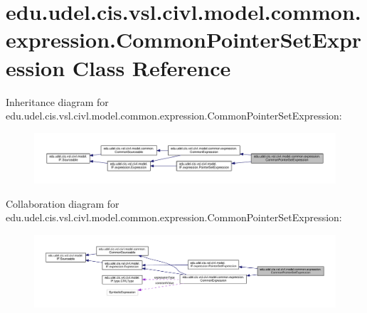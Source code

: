 \hypertarget{classedu_1_1udel_1_1cis_1_1vsl_1_1civl_1_1model_1_1common_1_1expression_1_1CommonPointerSetExpression}{}\section{edu.\+udel.\+cis.\+vsl.\+civl.\+model.\+common.\+expression.\+Common\+Pointer\+Set\+Expression Class Reference}
\label{classedu_1_1udel_1_1cis_1_1vsl_1_1civl_1_1model_1_1common_1_1expression_1_1CommonPointerSetExpression}


Inheritance diagram for edu.\+udel.\+cis.\+vsl.\+civl.\+model.\+common.\+expression.\+Common\+Pointer\+Set\+Expression\+:
\nopagebreak
\begin{figure}[H]
\begin{center}
\leavevmode
\includegraphics[width=350pt]{classedu_1_1udel_1_1cis_1_1vsl_1_1civl_1_1model_1_1common_1_1expression_1_1CommonPointerSetExpression__inherit__graph}
\end{center}
\end{figure}


Collaboration diagram for edu.\+udel.\+cis.\+vsl.\+civl.\+model.\+common.\+expression.\+Common\+Pointer\+Set\+Expression\+:
\nopagebreak
\begin{figure}[H]
\begin{center}
\leavevmode
\includegraphics[width=350pt]{classedu_1_1udel_1_1cis_1_1vsl_1_1civl_1_1model_1_1common_1_1expression_1_1CommonPointerSetExpression__coll__graph}
\end{center}
\end{figure}
